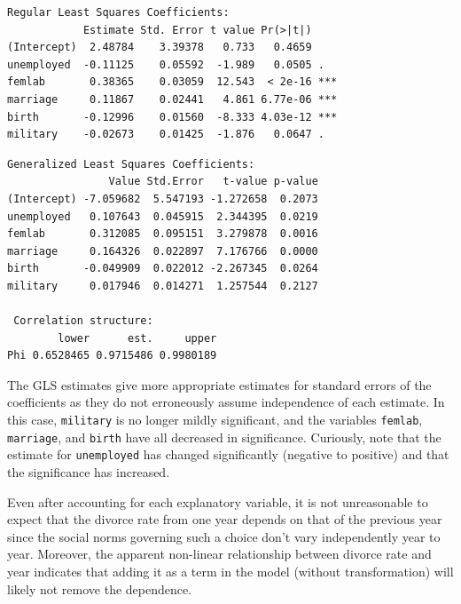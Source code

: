 \documentclass{homework}
\begin{document}
\begin{longproblem}
\begin{minipage}{.5\textwidth}
\vspace{-3em}
{\footnotesize
\begin{verbatim}
Regular Least Squares Coefficients:
            Estimate Std. Error t value Pr(>|t|)    
(Intercept)  2.48784    3.39378   0.733   0.4659    
unemployed  -0.11125    0.05592  -1.989   0.0505 .  
femlab       0.38365    0.03059  12.543  < 2e-16 ***
marriage     0.11867    0.02441   4.861 6.77e-06 ***
birth       -0.12996    0.01560  -8.333 4.03e-12 ***
military    -0.02673    0.01425  -1.876   0.0647 .  
\end{verbatim}
}
\end{minipage}
\begin{minipage}{.5\textwidth}
{\footnotesize
\begin{verbatim}
Generalized Least Squares Coefficients:
                Value Std.Error   t-value p-value
(Intercept) -7.059682  5.547193 -1.272658  0.2073
unemployed   0.107643  0.045915  2.344395  0.0219
femlab       0.312085  0.095151  3.279878  0.0016
marriage     0.164326  0.022897  7.176766  0.0000
birth       -0.049909  0.022012 -2.267345  0.0264
military     0.017946  0.014271  1.257544  0.2127

 Correlation structure:
        lower      est.     upper
Phi 0.6528465 0.9715486 0.9980189
\end{verbatim}
}
\end{minipage}

The GLS estimates give more appropriate estimates for standard errors of the coefficients as they do not erroneously assume independence of each estimate.  In this case, \texttt{military} is no longer mildly significant, and the variables \texttt{femlab}, \texttt{marriage}, and \texttt{birth} have all decreased in significance.  Curiously, note that the estimate for \texttt{unemployed} has changed significantly (negative to positive) and that the significance has increased.


Even after accounting for each explanatory variable, it is not unreasonable to expect that the divorce rate from one year depends on that of the previous year since the social norms governing such a choice don't vary independently year to year.  Moreover, the apparent non-linear relationship between divorce rate and year indicates that adding it as a term in the model (without transformation) will likely not remove the dependence. 
\end{longproblem}
\newpage
\end{document}
